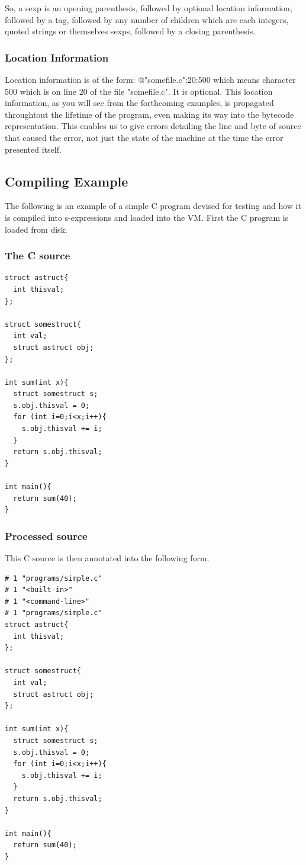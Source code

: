 \documentclass[10pt,a4paper]{report}
\begin{document}
So, a sexp is an opening parenthesis, followed by optional location
information, followed by a tag, followed by any number of children
which are each integers, quoted strings or themselves sexps,
followed by a closing parenthesis.

\subsubsection{Location Information}
Location information is of the form: @"somefile.c":20:500 which means character 500 which is on line 20 of the file
"somefile.c". It is optional. This location information, as you will see from the forthcoming examples, is propagated throughtout the lifetime of the program, even making its way into the bytecode representation. This enables us to give errors detailing the line and byte of source that caused the error, not just the state of the machine at the time the error presented itself.

\subsection{Compiling Example}
The following is an example of a simple C program devised for testing and how it is compiled into s-expressions and loaded into the VM. First the C program is loaded from disk.

\subsubsection{The C source}
\begin{verbatim}
struct astruct{
  int thisval;
};

struct somestruct{
  int val;
  struct astruct obj;
};

int sum(int x){
  struct somestruct s;
  s.obj.thisval = 0;
  for (int i=0;i<x;i++){
    s.obj.thisval += i;
  }
  return s.obj.thisval;
}

int main(){
  return sum(40);
}
\end{verbatim}

\subsubsection{Processed source}
This C source is then annotated into the following form.
\begin{verbatim}
# 1 "programs/simple.c"
# 1 "<built-in>"
# 1 "<command-line>"
# 1 "programs/simple.c"
struct astruct{
  int thisval;
};

struct somestruct{
  int val;
  struct astruct obj;
};

int sum(int x){
  struct somestruct s;
  s.obj.thisval = 0;
  for (int i=0;i<x;i++){
    s.obj.thisval += i;
  }
  return s.obj.thisval;
}

int main(){
  return sum(40);
}
\end{verbatim}
\end{document}
